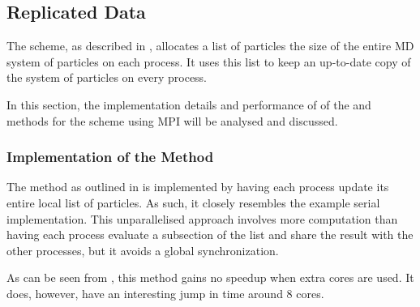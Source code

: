 \subsection{Replicated Data}
\label{sec:replicated_data_implementation}

%
The \replicateddata{} scheme, as described in
,
allocates a list of particles the size of
the entire MD system of particles
on each process.
%
It uses this list to keep an up-to-date copy of the system of particles
on every process.

In this section, the implementation details and performance of
of the \individualoperation{} and \pairoperation{} methods
for the \replicateddata{} scheme using MPI will be analysed and discussed.


%
%

\subsubsection{Implementation of the \individualoperation{} Method}
\label{sec:replicated_data_individual_operation_implementation}

The \individualoperation{} method as outlined in
is implemented by having each process update
its entire local list of particles.
%
As such, it closely resembles the example serial implementation.
%
This unparallelised approach involves more computation than
having each process evaluate a subsection of the list and
share the result with the other processes,
but it avoids a global synchronization.


%

%
%
\begin{figure}[!h]
    
    \caption{
        \vZeroSpeedupCaption
            {\replicateddata{}}
            {\individualoperation{}}
    }
    \label{fig:v0_replicated_data_individual_operation_speedups}
\end{figure}


\vZeroSpeedupExplanation
    {}
    {\replicateddata{}}
    {\individualoperation{}}

As can be seen from 
,
this method gains no speedup when extra cores are used.
%
It does, however, have an interesting jump in time around 8 cores.


